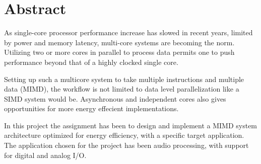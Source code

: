 
\section*{Abstract}

As single-core processor performance increase has slowed in recent years,
limited by power and memory latency, multi-core systems are becoming the norm.
Utilizing two or more cores in parallel to process data permits one to push
performance beyond that of a highly clocked single core. \newline

Setting up such a multicore system to take multiple instructions and multiple
data (MIMD), the workflow is not limited to data level parallelization like a
SIMD system would be. Asynchronous and independent cores also gives
opportunities for more energy effecient implementations. \newline

In this project the assignment has been to design and implement a MIMD system
architecture optimized for energy efficiency, with a specific target
application. The application chosen for the project has been audio processing,
with support for digital and analog I/O.
